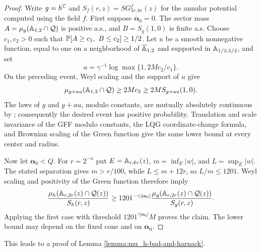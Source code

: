 \documentclass[12pt]{amsart}
\numberwithin{equation}{section}
\begin{document}
	\begin{proof}
		Write $g=h^\C$ and $S_f(r,z)=SG^f_{3r,6r}(z)$ for the annular potential computed using the field $f$.
		First suppose $\boldsymbol\alpha_0=0$. The sector mass $A=\mu_g(\A_{1,2}\cap\mathcal Q)$ is positive a.s., and $B=S_g(1,0)$ is finite a.s. Choose $c_1,c_2>0$ such that $\P[A\ge c_1,\ B\le c_2]\ge1/2$.
		Let $u$ be a smooth nonnegative function, equal to one on a neighborhood of $\overline{\A}_{1,2}$ and supported in $\A_{1/2,5/2}$, and set
		\[
		 a=\gamma^{-1}\log\max\{1,2Mc_2/c_1\}.
		\]
		On the preceding event, Weyl scaling and the support of $u$ give
		\[
		 \mu_{g+au}(\A_{1,2}\cap\mathcal Q)\ge 2Mc_2\ge 2M S_{g+au}(1,0).
		\]
		The laws of $g$ and $g+au$, modulo constants, are mutually absolutely continuous by \cite[Proposition 2.9]{miller2017imaginary}; consequently the desired event has positive probability. Translation and scale invariance of the GFF modulo constants, the LQG coordinate-change formula, and Brownian scaling of the Green function give the same lower bound at every center and radius.

		Now let $\boldsymbol\alpha_0<Q$. For $r=2^{-n}$ put $E=\A_{r,6r}(z)$, $m=\inf_E|w|$, and $L=\sup_E|w|$. The stated separation gives $m>r/100$, while $L\le m+12r$, so $L/m\le1201$. Weyl scaling and positivity of the Green function therefore imply
		\[
		 \frac{\mu_h(\A_{r,2r}(z)\cap\mathcal Q(z))}{S_h(r,z)}
		 \ge 1201^{-\gamma|\boldsymbol\alpha_0|}
		 \frac{\mu_g(\A_{r,2r}(z)\cap\mathcal Q(z))}{S_g(r,z)}.
		\]
		Applying the first case with threshold $1201^{\gamma|\boldsymbol\alpha_0|}M$ proves the claim. The lower bound may depend on the fixed cone and on $\boldsymbol\alpha_0$.
	\end{proof}
	This leads to a proof of Lemma \ref{lemma:mu_h-bad-and-harnack}.
\end{document}
